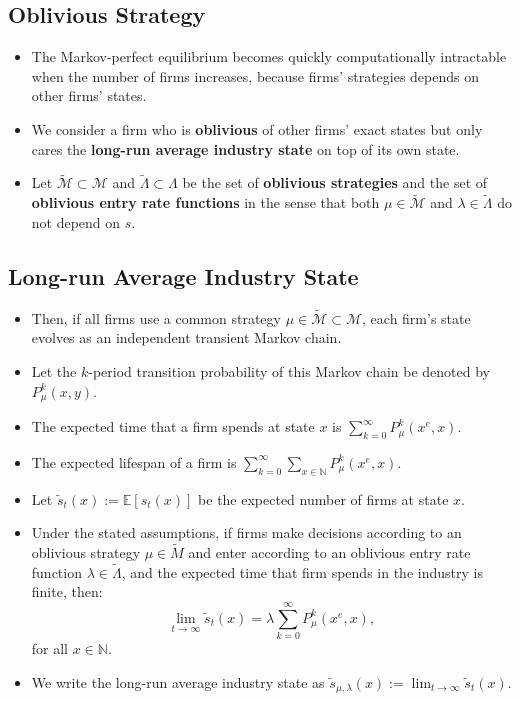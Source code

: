\documentclass[
]{book}
\providecommand{\tightlist}{%
  \setlength{\itemsep}{0pt}\setlength{\parskip}{0pt}}
\begin{document}
\hypertarget{oblivious-strategy}{%
\subsection{Oblivious Strategy}\label{oblivious-strategy}}

\begin{itemize}
\tightlist
\item
  The Markov-perfect equilibrium becomes quickly computationally
  intractable when the number of firms increases, because firms'
  strategies depends on other firms' states.
\item
  We consider a firm who is \textbf{oblivious} of other firms' exact states
  but only cares the \textbf{long-run average industry state} on top of its
  own state.
\item
  Let \(\widetilde{\mathcal{M}} \subset \mathcal{M}\) and
  \(\widetilde{\Lambda} \subset \Lambda\) be the set of \textbf{oblivious
  strategies} and the set of \textbf{oblivious entry rate functions} in
  the sense that both \(\mu \in \widetilde{\mathcal{M}}\) and
  \(\lambda \in \widetilde{\Lambda}\) do not depend on \(s\).
\end{itemize}

\hypertarget{long-run-average-industry-state}{%
\subsection{Long-run Average Industry State}\label{long-run-average-industry-state}}

\begin{itemize}
\tightlist
\item
  Then, if all firms use a common strategy
  \(\mu \in \widetilde{\mathcal{M}} \subset \mathcal{M}\), each firm's
  state evolves as an independent transient Markov chain.
\item
  Let the \(k\)-period transition probability of this Markov chain be
  denoted by \(P_{\mu}^k(x, y)\).
\item
  The expected time that a firm spends at state \(x\) is
  \(\sum_{k = 0}^\infty P_\mu^k(x^e, x)\).
\item
  The expected lifespan of a firm is
  \(\sum_{k = 0}^\infty \sum_{x \in \mathbb{N}} P_\mu^k(x^e, x)\).
\item
  Let \(\tilde{s}_t(x) := \mathbb{E}[s_t(x)]\) be the expected number of
  firms at state \(x\).
\item
  Under the stated assumptions, if firms make decisions according to
  an oblivious strategy \(\mu \in \widetilde{M}\) and enter according to
  an oblivious entry rate function \(\lambda \in \widetilde{\Lambda}\),
  and the expected time that firm spends in the industry is finite,
  then: \[
   \lim_{t \to \infty} \tilde{s}_t(x) = \lambda \sum_{k = 0}^\infty P_{\mu}^k(x^e, x),
   \] for all \(x \in \mathbb{N}\).
\item
  We write the long-run average industry state as
  \(\tilde{s}_{\mu, \lambda}(x) := \lim_{t \to \infty} \tilde{s}_t(x)\).
\end{itemize}
\end{document}

